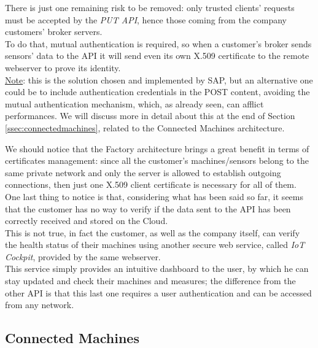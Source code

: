 \documentclass[12pt]{report}
\begin{document}
{{There is just one remaining risk to be removed: only trusted clients' requests must be accepted by the \emph{PUT API}, hence those coming from the company customers' broker servers.\\
To do that, mutual authentication is required, so when a customer's broker sends sensors' data to the API it will send even its own X.509 certificate to the remote webserver to prove its identity.\\
\underline{Note}: this is the solution chosen and implemented by SAP, but an alternative one could be to include authentication credentials in the POST content, avoiding the mutual authentication mechanism, which, as already seen, can afflict performances.
We will discuss more in detail about this at the end of Section \ref{ssec:connectedmachines}, related to the Connected Machines architecture.

We should notice that the Factory architecture brings a great benefit in terms of certificates management: since all the customer's machines/sensors belong to the same private network and only the server is allowed to establish outgoing connections, then just one X.509 client certificate is necessary for all of them.\\

One last thing to notice is that, considering what has been said so far, it seems that the customer has no way to verify if the data sent to the API has been correctly received and stored on the Cloud.\\
This is not true, in fact the customer, as well as the company itself, can verify the health status of their machines using another secure web service, called \emph{IoT Cockpit}, provided by the same webserver.\\
This service simply provides an intuitive dashboard to the user, by which he can stay updated and check their machines and measures; the difference from the other API is that this last one requires a user authentication and can be accessed from any network.\\


\subsection{Connected Machines}

}}
\end{document}
